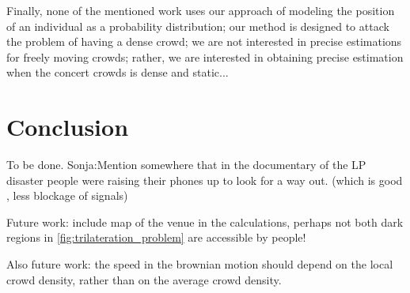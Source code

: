 \documentclass[10pt,a4paper]{article}
\begin{document}

Finally, none of the mentioned work uses our approach of modeling the position of an individual as a probability distribution; our method is designed to attack the problem of having a dense crowd; we are not interested in precise estimations for freely moving crowds; rather, we are interested in obtaining precise estimation when the  concert crowds is dense and static...


\section{Conclusion}\label{sec:conclusion}
To be done. 
Sonja:Mention somewhere that in the documentary of the LP disaster people were raising their phones up to look for a way out. (which is good , less blockage of signals)




Future work: include map of the venue in the calculations, perhaps not both dark  regions in \ref{fig:trilateration_problem} are accessible by people!

Also future work: the speed in the brownian motion should depend on the local crowd density, rather than on the average crowd density.



\end{document}
